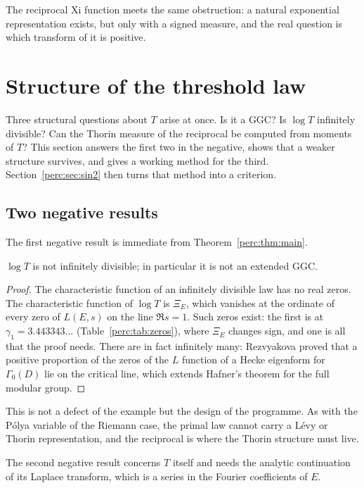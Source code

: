 The reciprocal Xi function meets the same obstruction: a natural exponential representation exists, but only with a signed measure, and the real question is which transform of it is positive.

\section{Structure of the threshold law}\label{perc:sec:progress}

Three structural questions about $T$ arise at once. Is it a GGC? Is $\log T$ infinitely divisible? Can the Thorin measure of the reciprocal be computed from moments of $T$? This section answers the first two in the negative, shows that a weaker structure survives, and gives a working method for the third. Section~\ref{perc:sec:sin2} then turns that method into a criterion.

\subsection{Two negative results}\label{perc:sec:notggc}

The first negative result is immediate from Theorem~\ref{perc:thm:main}.

\begin{theorem}\label{perc:thm:notid}
$\log T$ is not infinitely divisible; in particular it is not an extended GGC.
\end{theorem}
\begin{proof}
The characteristic function of an infinitely divisible law has no real zeros. The characteristic function of $\log T$ is $\Xi_E$, which vanishes at the ordinate of every zero of $L(E,s)$ on the line $\Re s = 1$. Such zeros exist: the first is at $\gamma_1 = 3.443343\ldots$ (Table~\ref{perc:tab:zeros}), where $\Xi_E$ changes sign, and one is all that the proof needs. There are in fact infinitely many: Rezvyakova \cite{rezvyakova2010} proved that a positive proportion of the zeros of the $L$ function of a Hecke eigenform for $\Gamma_0(D)$ lie on the critical line, which extends Hafner's theorem \cite{hafner1983} for the full modular group.
\end{proof}

This is not a defect of the example but the design of the programme. As with the Pólya variable of the Riemann case, the primal law cannot carry a Lévy or Thorin representation, and the reciprocal is where the Thorin structure must live.

The second negative result concerns $T$ itself and needs the analytic continuation of its Laplace transform, which is a series in the Fourier coefficients of $E$.

